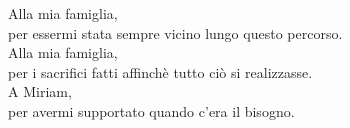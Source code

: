 \newpage\null\thispagestyle{empty}\newpage %
\thispagestyle{empty}
\newenvironment{dedication}
  {\clearpage           %
   \thispagestyle{empty}%
   \vspace*{\stretch{1}}%
   \itshape             %
   \raggedleft          %
  }
  {\par %
   \vspace{\stretch{3}} %
   \clearpage           %
  }

\begin{dedication}
Alla mia famiglia, \\per essermi stata sempre vicino lungo questo percorso.\\
Alla mia famiglia, \\per i sacrifici fatti affinchè tutto ciò si realizzasse.\\
A Miriam, \\per avermi supportato quando c'era il bisogno.

\end{dedication}